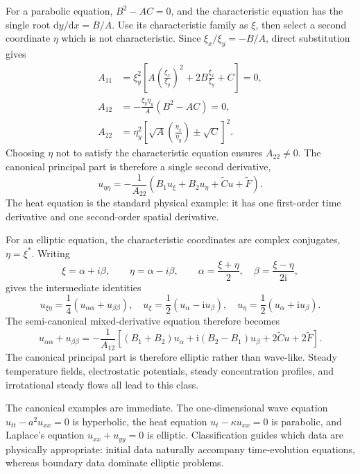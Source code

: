 For a parabolic equation, $B^2-AC=0$, and the characteristic equation has the single root $\mathrm{d}y/\mathrm{d}x=B/A$. Use its characteristic family as $\xi$, then select a second coordinate $\eta$ which is not characteristic. Since $\xi_x/\xi_y=-B/A$, direct substitution gives
\begin{align}
A_{11}&=\xi_y^2\left[A\left(\frac{\xi_x}{\xi_y}\right)^2
+2B\frac{\xi_x}{\xi_y}+C\right]=0,\\
A_{12}&=-\frac{\xi_y\eta_y}{A}(B^2-AC)=0,\\
A_{22}&=\eta_y^2\left[\sqrt A\left(\frac{\eta_x}{\eta_y}\right)
\pm\sqrt C\right]^2.
\end{align}
Choosing $\eta$ not to satisfy the characteristic equation ensures $A_{22}\not=0$. The canonical principal part is therefore a single second derivative,
\begin{equation}
u_{\eta\eta}=-\frac{1}{A_{22}}
\left(B_1u_\xi+B_2u_\eta+\widetilde C u+\widetilde F\right).
\end{equation}
The heat equation is the standard physical example: it has one first-order time derivative and one second-order spatial derivative.

For an elliptic equation, the characteristic coordinates are complex conjugates, $\eta=\xi^*$. Writing
\begin{equation}
\xi=\alpha+i\beta,\qquad \eta=\alpha-i\beta,
\qquad
\alpha=\frac{\xi+\eta}{2},\quad
\beta=\frac{\xi-\eta}{2\mathrm{i}},
\end{equation}
gives the intermediate identities
\begin{equation}
u_{\xi\eta}=\frac14\left(u_{\alpha\alpha}+u_{\beta\beta}\right),
\quad
u_\xi=\frac12(u_\alpha-\mathrm{i}u_\beta),
\quad
u_\eta=\frac12(u_\alpha+\mathrm{i}u_\beta).
\end{equation}
The semi-canonical mixed-derivative equation therefore becomes
\begin{equation}
u_{\alpha\alpha}+u_{\beta\beta}
=-\frac{1}{A_{12}}\left[(B_1+B_2)u_\alpha
+\mathrm{i}(B_2-B_1)u_\beta+2\widetilde C u+2\widetilde F\right].
\end{equation}
The canonical principal part is therefore elliptic rather than wave-like. Steady temperature fields, electrostatic potentials, steady concentration profiles, and irrotational steady flows all lead to this class.

The canonical examples are immediate. The one-dimensional wave equation $u_{tt}-a^2u_{xx}=0$ is hyperbolic, the heat equation $u_t-\kappa u_{xx}=0$ is parabolic, and Laplace's equation $u_{xx}+u_{yy}=0$ is elliptic. Classification guides which data are physically appropriate: initial data naturally accompany time-evolution equations, whereas boundary data dominate elliptic problems.